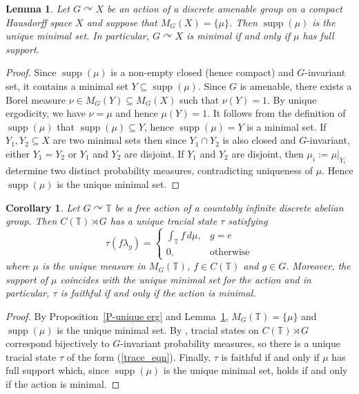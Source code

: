 \documentclass[11pt,a4paper,leqno]{amsart}
\newtheorem{lemma}[thm]{Lemma}
\newtheorem{cor}[thm]{Corollary}
\theoremstyle{definition}
\theoremstyle{remark}
\numberwithin{equation}{section}
\theoremstyle{plain}
\DeclareMathOperator{\supp}{supp}
\newcommand{\Tb}{\mathbb{T}}
\begin{document}
\begin{lemma}\label{L-minimal supp}
    Let $G\curvearrowright X$ be an action of a discrete amenable group on a compact Hausdorff space $X$ and suppose that $M_G(X) = \{\mu\}$. Then $\supp(\mu)$ is the unique minimal set. In particular, $G\curvearrowright X$ is minimal if and only if $\mu$ has full support.  
\end{lemma}

\begin{proof}
     Since $\supp(\mu)$ is a non-empty closed (hence compact) and $G$-invariant set, it contains a minimal set $Y\subseteq \supp(\mu)$. Since $G$ is amenable, there exists a Borel measure $\nu \in M_G(Y)\subseteq M_G(X)$ such that $\nu(Y) = 1$. By unique ergodicity, we have $\nu = \mu$ and hence $\mu(Y) = 1$. It follows from the definition of $\supp(\mu)$ that $\supp(\mu)\subseteq Y$, hence $\supp(\mu) = Y$ is a minimal set. If $Y_1,Y_2\subseteq X$ are two minimal sets then since $Y_1\cap Y_2$ is also closed and $G$-invariant, either $Y_1 = Y_2$ or $Y_1$ and $Y_2$ are disjoint. If $Y_1$ and $Y_2$ are disjoint, then $\mu_i := \mu|_{Y_i}$ determine two distinct probability measures, contradicting uniqueness of $\mu$. Hence $\supp(\mu)$ is the unique minimal set. 
\end{proof}

\begin{cor}\label{T-trace}
    Let $G\curvearrowright \Tb$ be a free action of a countably infinite discrete abelian group. Then $C(\Tb)\rtimes G$ has a unique tracial state $\tau$ satisfying 
    \begin{equation}
        \tau(f\lambda_g) = \begin{cases}
            \displaystyle\int_{\Tb} f\, d\mu, & g = e\\
            0, & \text{otherwise}
        \end{cases} \label{trace_eqn}
    \end{equation}
    where $\mu$ is the unique measure in $M_G(\Tb)$, $f\in C(\Tb)$ and $g\in G$. Moreover, the support of $\mu$ coincides with the unique minimal set for the action and in particular, $\tau$ is faithful if and only if the action is minimal. 
\end{cor}

\begin{proof}
    By Proposition~\ref{P-unique erg} and Lemma~\ref{L-minimal supp}, $M_G(\Tb) = \{\mu\}$ and $\supp(\mu)$ is the unique minimal set. By \cite[Corollary 2.8]{KawTakTom90}, tracial states on $C(\Tb)\rtimes G$ correspond bijectively to $G$-invariant probability measures, so there is a unique tracial state $\tau$ of the form (\ref{trace_eqn}). Finally, $\tau$ is faithful if and only if $\mu$ has full support which, since $\supp(\mu)$ is the unique minimal set, holds if and only if the action is minimal.  
\end{proof} 
\end{document}
